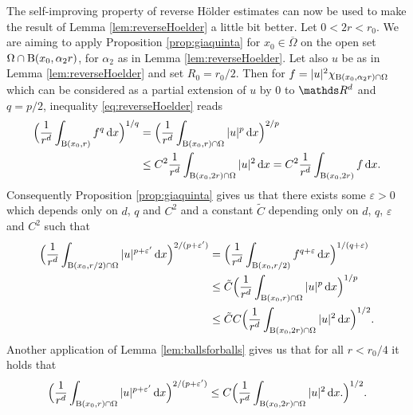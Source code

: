   \begin{rem}
    \label{rem:reverseHoelder}
    The self-improving property of reverse Hölder estimates can now be used to make the result of Lemma \ref{lem:reverseHoelder} a little bit better. 
    Let $0 < 2r < r_0$.
    We are aiming to apply Proposition \ref{prop:giaquinta} for $x_0 \in \overline\Omega$ on the open set $\Omega \cap \mathrm{B}(x_0, \alpha_2 r)$, for $\alpha_2$ as in Lemma \ref{lem:reverseHoelder}.
    Let also $u$ be as in Lemma \ref{lem:reverseHoelder} and set $R_0 = r_0/2$. 
    Then for $f = |u|^{2} \chi_{\mathrm{B}(x_0,\alpha_2 r) \cap \Omega}$ which can be considered as a partial extension of $u$ by $0$ to $\R^d$ and $q = p/2$, inequality \eqref{eq:reverseHoelder} reads
    \begin{align*}
      \Big( \frac{1}{r^d} \int_{\mathrm{B}(x_0, r)} f^q \, {\operatorname{d}\!{x}} \Big)^{1/q}
      &= \Big( \frac{1}{r^d} \int_{\mathrm{B}(x_0, r) \cap \Omega} |u|^p \, {\operatorname{d}\!{x}} \Big)^{2/p} \\
      &\leq C^2 \frac{1}{r^d} \int_{\mathrm{B}(x_0, 2r) \cap \Omega} |u|^2 \, {\operatorname{d}\!{x}}
      = C^2 \frac{1}{r^d} \int_{\mathrm{B}(x_0, 2r)} f \, {\operatorname{d}\!{x}}.
    \end{align*}
    Consequently Proposition \ref{prop:giaquinta} gives us that there exists some $\varepsilon > 0$ which depends only on $d$, $q$ and $C^2$ and a constant $\tilde C$ depending only on $d$, $q$, $\varepsilon$ and $C^2$ such that
    \begin{align*}
      \Big( \frac{1}{r^d} \int_{\mathrm{B}(x_0, r/2) \cap \Omega} |u|^{p + \varepsilon'}\, {\operatorname{d}\!{x}} \Big)^{2/(p + \varepsilon ')} 
      &= \Big( \frac{1}{r^d} \int_{\mathrm{B}(x_0, r/2)} f^{q + \varepsilon} \, {\operatorname{d}\!{x}} \Big)^{1/(q + \varepsilon)} \\
      &\leq \tilde C \Big( \frac{1}{r^d} \int_{\mathrm{B}(x_0, r) \cap \Omega} |u|^p \, {\operatorname{d}\!{x}} \Big)^{1/p} \\
      &\leq \tilde C C \Big( \frac{1}{r^d} \int_{\mathrm{B}(x_0,2r)\cap \Omega } |u|^2 \, {\operatorname{d}\!{x}} \Big)^{1/2}.
    \end{align*}
    Another application of Lemma \ref{lem:ballsforballs} gives us that for all $r < r_0/4$ it holds that
    \begin{align}
      \label{eq:improvedreverseHoelder}
      \Big( \frac{1}{r^d} \int_{\mathrm{B}(x_0, r) \cap \Omega} |u|^{p + \varepsilon'} \, {\operatorname{d}\!{x}} \Big)^{2/(p + \varepsilon')}
      \leq C \Big(\frac{1}{r^d} \int_{\mathrm{B}(x_0, 2r) \cap \Omega} |u|^2 \, {\operatorname{d}\!{x}}.  \Big)^{1/2}.
    \end{align}
  \end{rem}


